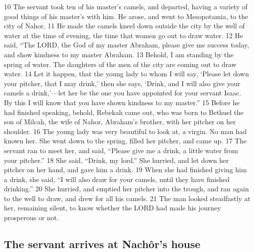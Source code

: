 {10} The servant took ten of his master's camels, and departed, having a
variety of good things of his master's with him. He arose, and went to
Mesopotamia, to the city of Nahor. {11} He made the camels kneel down
outside the city by the well of water at the time of evening, the time
that women go out to draw water. {12} He said, ``The LORD, the God of my
master Abraham, please give me success today, and show kindness to my
master Abraham. {13} Behold, I am standing by the spring of water. The
daughters of the men of the city are coming out to draw water. {14} Let
it happen, that the young lady to whom I will say, `Please let down your
pitcher, that I may drink,' then she says, `Drink, and I will also give
your camels a drink,'---let her be the one you have appointed for your
servant Isaac. By this I will know that you have shown kindness to my
master.'' {15} Before he had finished speaking, behold, Rebekah came
out, who was born to Bethuel the son of Milcah, the wife of Nahor,
Abraham's brother, with her pitcher on her shoulder. {16} The young lady
was very beautiful to look at, a virgin. No man had known her. She went
down to the spring, filled her pitcher, and came up. {17} The servant
ran to meet her, and said, ``Please give me a drink, a little water from
your pitcher.'' {18} She said, ``Drink, my lord.'' She hurried, and let
down her pitcher on her hand, and gave him a drink. {19} When she had
finished giving him a drink, she said, ``I will also draw for your
camels, until they have finished drinking.'' {20} She hurried, and
emptied her pitcher into the trough, and ran again to the well to draw,
and drew for all his camels. {21} The man looked steadfastly at her,
remaining silent, to know whether the LORD had made his journey
prosperous or not.

\hypertarget{the-servant-arrives-at-nachuxf4rs-house}{%
\subsection{The servant arrives at Nachôr's
house}\label{the-servant-arrives-at-nachuxf4rs-house}}

